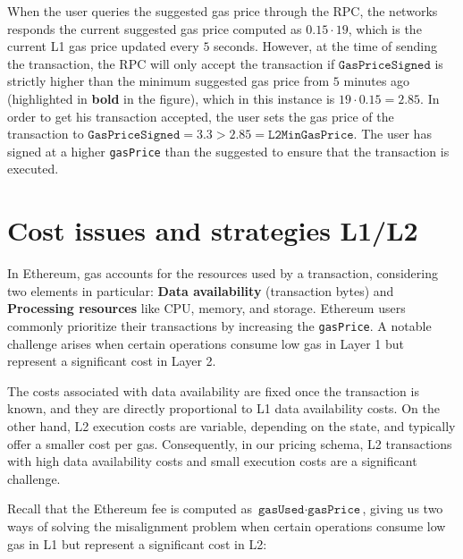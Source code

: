 When the user queries the suggested gas price through the RPC, the networks responds the current suggested gas price computed as $0.15 \cdot 19$, which is the current L1 gas price updated every $5$ seconds. However, at the time of sending the transaction, the RPC will only accept the transaction if $\texttt{GasPriceSigned}$ is strictly higher than the minimum suggested gas price from $5$ minutes ago (highlighted in \textbf{bold} in the figure), which in this instance is $19 \cdot 0.15 = 2.85$. In order to get his transaction accepted, the user sets the gas price of the transaction to $\texttt{GasPriceSigned} = 3.3 > 2.85 = \texttt{L2MinGasPrice}.$ The user has signed at a higher \texttt{gasPrice} than the suggested to ensure that the transaction is executed.




\section{Cost issues and strategies L1/L2}


In Ethereum, gas accounts for the resources used by a transaction, considering two elements in particular: \textbf{Data availability} (transaction bytes) and \textbf{Processing resources} like CPU, memory, and storage. Ethereum users commonly prioritize their transactions by increasing the \texttt{gasPrice}. A notable challenge arises when certain operations consume low gas in Layer 1 but represent a significant cost in Layer 2.

The costs associated with data availability are fixed once the transaction is known, and they are directly proportional to L1 data availability costs. On the other hand, L2 execution costs are variable, depending on the state, and typically offer a smaller cost per gas. Consequently, in our pricing schema, L2 transactions with high data availability costs and small execution costs are a significant challenge.

Recall that the Ethereum fee is computed as $\texttt{gasUsed} \cdot \texttt{gasPrice}$, giving us two ways of solving the misalignment problem when certain operations consume low gas in L1 but represent a significant cost in L2:

